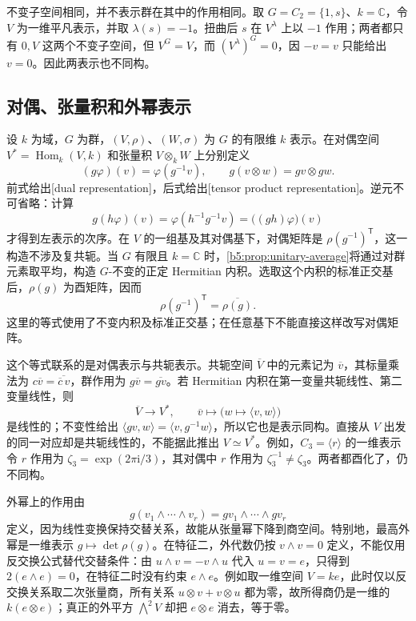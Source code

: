 \ProseParagraphBreak
不变子空间相同，并不表示群在其中的作用相同。取 \(G=C_2=\{1,s\}\)、\(k=\mathbb C\)，令 \(V\) 为一维平凡表示，并取 \(\lambda(s)=-1\)。扭曲后 \(s\) 在 \(V^\lambda\) 上以 \(-1\) 作用；两者都只有 \(0,V\) 这两个不变子空间，但 \(V^G=V\)，而 \((V^\lambda)^G=0\)，因 \(-v=v\) 只能给出 \(v=0\)。因此两表示也不同构。

\subsection{对偶、张量积和外幂表示}
\label{b5:subsec:0102:03}

设 \(k\) 为域，\(G\) 为群，\((V,\rho)\)、\((W,\sigma)\) 为 \(G\) 的有限维 \(k\) 表示。在对偶空间 \(V^*=\operatorname{Hom}_k(V,k)\) 和张量积 \(V\otimes_k W\) 上分别定义
\begin{equation}\label{b5:eq:dual-tensor-action}
	(g\varphi)(v)=\varphi(g^{-1}v),\qquad g(v\otimes w)=gv\otimes gw.
\end{equation}
前式给出[dual representation]，后式给出[tensor product representation]。逆元不可省略：计算
\[
	g(h\varphi)(v)=\varphi(h^{-1}g^{-1}v)=\bigl((gh)\varphi\bigr)(v)
\]
才得到左表示的次序。在 \(V\) 的一组基及其对偶基下，对偶矩阵是 \(\rho(g^{-1})^{\mathsf T}\)，这一构造不涉及复共轭。当 \(G\) 有限且 \(k=\mathbb C\) 时，\cref{b5:prop:unitary-average}将通过对群元素取平均，构造 \(G\)-不变的正定 Hermitian 内积。选取这个内积的标准正交基后，\(\rho(g)\) 为酉矩阵，因而
\[
	\rho(g^{-1})^{\mathsf T}=\overline{\rho(g)}.
\]
这里的等式使用了不变内积及标准正交基；在任意基下不能直接这样改写对偶矩阵。

\ProseParagraphBreak
这个等式联系的是对偶表示与共轭表示。共轭空间 \(\overline V\) 中的元素记为 \(\overline v\)，其标量乘法为 \(c\overline v=\overline{\overline c\,v}\)，群作用为 \(g\overline v=\overline{gv}\)。若 Hermitian 内积在第一变量共轭线性、第二变量线性，则
\[
	\overline V\longrightarrow V^*,\qquad \overline v\longmapsto\bigl(w\longmapsto\langle v,w\rangle\bigr)
\]
是线性的；不变性给出 \(\langle gv,w\rangle=\langle v,g^{-1}w\rangle\)，所以它也是表示同构。直接从 \(V\) 出发的同一对应却是共轭线性的，不能据此推出 \(V\simeq V^*\)。例如，\(C_3=\langle r\rangle\) 的一维表示令 \(r\) 作用为 \(\zeta_3=\exp(2\pi\mathrm i/3)\)，其对偶中 \(r\) 作用为 \(\zeta_3^{-1}\ne\zeta_3\)。两者都酉化了，仍不同构。

\ProseParagraphBreak
外幂上的作用由
\[
	g(v_1\wedge\cdots\wedge v_r)=gv_1\wedge\cdots\wedge gv_r
\]
定义，因为线性变换保持交替关系，故能从张量幂下降到商空间。特别地，最高外幂是一维表示 \(g\mapsto\det\rho(g)\)。在特征二，外代数仍按 \(v\wedge v=0\) 定义，不能仅用反交换公式替代交替条件：由 \(u\wedge v=-v\wedge u\) 代入 \(u=v=e\)，只得到 \(2(e\wedge e)=0\)，在特征二时没有约束 \(e\wedge e\)。例如取一维空间 \(V=ke\)，此时仅以反交换关系取二次张量商，所有关系 \(u\otimes v+v\otimes u\) 都为零，故所得商仍是一维的 \(k(e\otimes e)\)；真正的外平方 \(\bigwedge^2V\) 却把 \(e\otimes e\) 消去，等于零。


